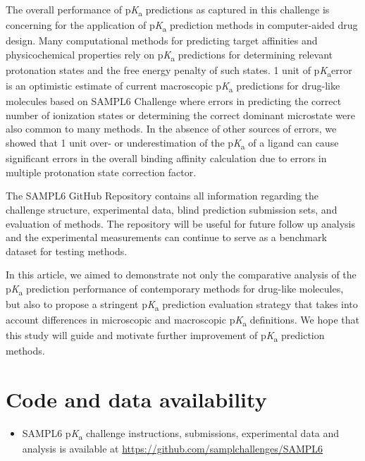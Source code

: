 \documentclass[9pt,lineno,final]{elife}
\newcommand{\pKa}{p\textit{K}\textsubscript{a}}
\begin{document}
The overall performance of \pKa{} predictions as captured in this challenge is concerning for the application of \pKa{} prediction methods in computer-aided drug design. Many computational methods for predicting target affinities and physicochemical properties rely on \pKa{} predictions for determining relevant protonation states and the free energy penalty of such states. 1 unit of \pKa error is an optimistic estimate of current macroscopic \pKa{} predictions for drug-like molecules based on SAMPL6 Challenge where errors in predicting the correct number of ionization states or determining the correct dominant microstate were also common to many methods. In the absence of other sources of errors, we showed that 1 unit over- or underestimation of the \pKa{} of a ligand can cause significant errors in the overall binding affinity calculation due to errors in multiple protonation state correction factor. 

The SAMPL6 GitHub Repository contains all information regarding the challenge structure, experimental data, blind prediction submission sets, and evaluation of methods. The repository will be useful for future follow up analysis and the experimental measurements can continue to serve as a benchmark dataset for testing methods. 

In this article, we aimed to demonstrate not only the comparative analysis of the \pKa{} prediction performance of contemporary methods for drug-like molecules, but also to propose a stringent \pKa{} prediction evaluation strategy that takes into account differences in microscopic and macroscopic \pKa{} definitions. We hope that this study will guide and motivate further improvement of \pKa{} prediction methods.



\section{Code and data availability} \label{Code-and-Data-Availability}
\begin{minipage}{15cm}
\begin{itemize}

\item SAMPL6 \pKa{} challenge instructions, submissions, experimental data and analysis is available at  \href{https://github.com/samplchallenges/SAMPL6}{https://github.com/samplchallenges/SAMPL6}

\end{itemize}
\end{minipage}
\end{document}
